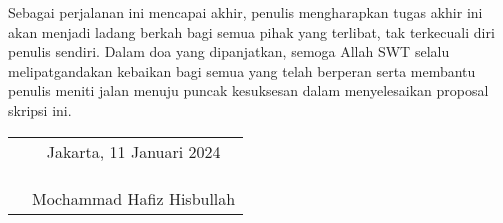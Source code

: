 Sebagai perjalanan ini mencapai akhir, penulis mengharapkan tugas akhir ini akan 
menjadi ladang berkah bagi semua pihak yang terlibat, tak terkecuali diri penulis 
sendiri. Dalam doa yang dipanjatkan, semoga Allah SWT selalu melipatgandakan kebaikan 
bagi semua yang telah berperan serta membantu penulis meniti jalan menuju puncak 
kesuksesan dalam menyelesaikan proposal skripsi ini.

\vspace{2cm}

\begin{tabular}{p{7.5cm}c}
	&Jakarta, 11 Januari 2024\\
	&\\
	&\\
	&\\
	&Mochammad Hafiz Hisbullah
\end{tabular}
